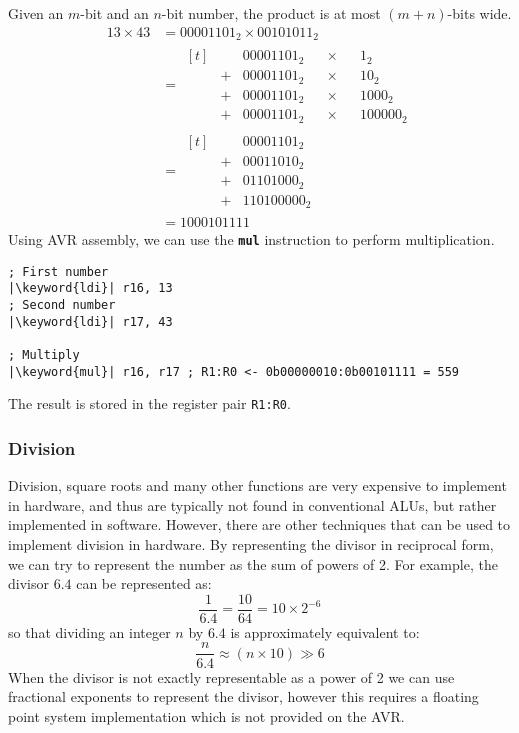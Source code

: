 \documentclass{article}
\newcommand{\keyword}[1]{\textcolor[rgb]{0.00,0.50,0.00}{\textbf{#1}}}
\newcommand{\keywordinline}[1]{\textcolor[rgb]{0.00,0.50,0.00}{\textbf{\texttt{#1}}}}
\begin{document}
Given an \(m\)-bit and an \(n\)-bit number, the product is at most
\((m+n)\)-bits wide.
\begin{align*}
    13 \times 43 & = 00001101_2 \times 00101011_2 \\
                 & =
    \begin{aligned}[t]
         &   & 00001101_2 &  & \times &  & 1_2      \\
         & + & 00001101_2 &  & \times &  & 10_2     \\
         & + & 00001101_2 &  & \times &  & 1000_2   \\
         & + & 00001101_2 &  & \times &  & 100000_2
    \end{aligned}
    \\
                 & =
    \begin{aligned}[t]
         &   & 00001101_2  \\
         & + & 00011010_2  \\
         & + & 01101000_2  \\
         & + & 110100000_2
    \end{aligned}
    \\
                 & = 1000101111
\end{align*}
Using AVR assembly, we can use the \keywordinline{mul} instruction to perform multiplication.
\begin{verbatim}
; First number
|\keyword{ldi}| r16, 13
; Second number
|\keyword{ldi}| r17, 43

; Multiply
|\keyword{mul}| r16, r17 ; R1:R0 <- 0b00000010:0b00101111 = 559
\end{verbatim}
The result is stored in the register pair \texttt{R1:R0}.
\subsubsection{Division}
Division, square roots and many other functions are very expensive to
implement in hardware, and thus are typically not found in conventional
ALUs, but rather implemented in software. However, there are other
techniques that can be used to implement division in hardware. By
representing the divisor in reciprocal form, we can try to represent
the number as the sum of powers of 2. For example, the divisor \(6.4\)
can be represented as:
\begin{equation*}
    \frac{1}{6.4} = \frac{10}{64} = 10 \times 2^{-6}
\end{equation*}
so that dividing an integer \(n\) by \(6.4\) is approximately equivalent to:
\begin{equation*}
    \frac{n}{6.4} \approx \left( n \times 10 \right) \gg 6
\end{equation*}
When the divisor is not exactly representable as a power of 2 we can use fractional
exponents to represent the divisor, however this requires a floating point
system implementation which is not provided on the AVR\@.
\end{document}
